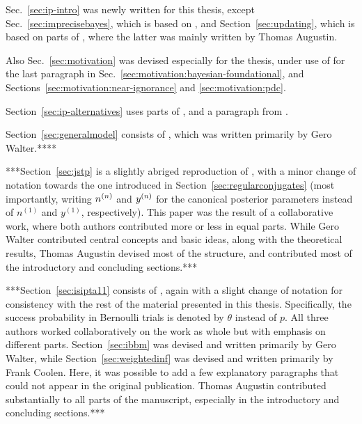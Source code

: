 
Sec.~\ref{sec:ip-intro} was newly written for this thesis,
except Sec.~\ref{sec:imprecisebayes}, which is based on \textcite[\S 4.2]{itip-statinf},
and Section~\ref{sec:updating}, which is based on parts of \textcite[\S 4.4]{itip-statinf},
where the latter was mainly written by Thomas Augustin.

Also Sec.~\ref{sec:motivation} was devised especially for the thesis,
under use of \textcite[\S 2.3]{itip-statinf} for the last paragraph in
Sec.~\ref{sec:motivation:bayesian-foundational},
and Sections~\ref{sec:motivation:near-ignorance} and \ref{sec:motivation:pdc}.

Section~\ref{sec:ip-alternatives} uses parts of \textcite[\S 2.2, 2.4]{itip-statinf},
and a paragraph from \textcite[\S 7]{itip-statinf}.

Section~\ref{sec:generalmodel} consists of \textcite[\S 4.3]{itip-statinf},
which was written primarily by Gero Walter.****

***Section~\ref{sec:jstp} is a slightly abriged reproduction of \textcite{Walter2009a},
with a minor change of notation towards the one introduced in Section~\ref{sec:regularconjugates}
(most importantly, writing $n^{(n)}$ and $y^{(n)}$ for the canonical posterior parameters
instead of $n^{(1)}$ and $y^{(1)}$, respectively).
This paper was the result of a collaborative work, where both authors contributed
more or less in equal parts. While Gero Walter contributed central concepts and basic ideas,
along with the theoretical results, Thomas Augustin devised most of the structure,
and contributed most of the introductory and concluding sections.***

***Section~\ref{sec:isipta11} consists of \textcite{Walter2011a},
again with a slight change of notation for consistency with the rest of the material presented in this thesis.
Specifically, the success probability in Bernoulli trials is denoted by $\theta$ instead of $p$.
All three authors worked collaboratively on the work as whole but with emphasis on different parts.
Section~\ref{sec:ibbm} was devised and written primarily by Gero Walter,
while Section~\ref{sec:weightedinf} was devised and written primarily by Frank Coolen.
Here, it was possible to add a few explanatory paragraphs that could not appear in the original publication. 
Thomas Augustin contributed substantially to all parts of the manuscript,
especially in the introductory and concluding sections.***

